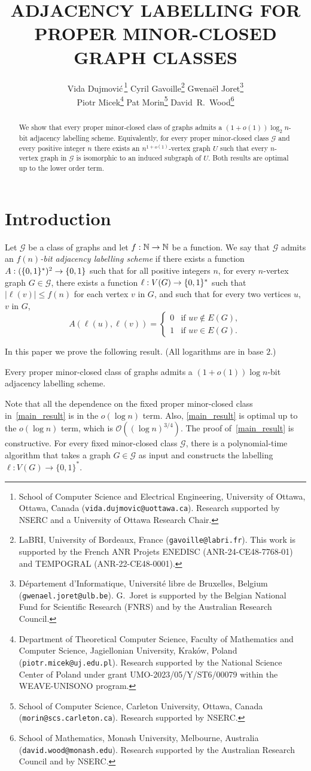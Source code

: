 \documentclass{patmorin}
\title{\MakeUppercase{\boldmath  Adjacency labelling for proper minor-closed graph classes}}
\author{
 Vida Dujmovi{\'c}\,\footnote{School of Computer Science and Electrical Engineering, University of Ottawa, Ottawa, Canada (\texttt{vida.dujmovic@uottawa.ca}). Research supported by NSERC and a University of Ottawa Research Chair.}
 \qquad
 Cyril Gavoille\footnote{LaBRI, University of Bordeaux, France (\texttt{gavoille@labri.fr}). This work is supported by the French ANR Projets ENEDISC (ANR-24-CE48-7768-01) and TEMPOGRAL (ANR-22-CE48-0001).}
 \qquad
  Gwena\"el Joret\footnote{D\'epartement d'Informatique, Universit\'e libre de Bruxelles, Belgium ({\tt gwenael.joret@ulb.be}). G.\ Joret is supported by the Belgian National Fund for Scientific Research (FNRS) and by the Australian Research Council.} \\[1ex]
 Piotr Micek\footnote{Department of Theoretical Computer Science, Faculty of Mathematics and Computer Science, Jagiellonian University, Kraków, Poland (\texttt{piotr.micek@uj.edu.pl}). Research supported by the National Science Center of Poland under grant UMO-2023/05/Y/ST6/00079 within the WEAVE-UNISONO program.}
 \qquad
 Pat Morin\footnote{School of Computer Science, Carleton University, Ottawa, Canada (\texttt{morin@scs.carleton.ca}). Research supported by NSERC.}
 \qquad
 David~R.~Wood\footnote{School of Mathematics, Monash University, Melbourne, Australia (\texttt{david.wood@monash.edu}). Research supported by the Australian Research Council and by NSERC.}
 }
\date{}
\renewcommand{\leq}{\leqslant}
\newcommand{\defin}[1]{\emph{\textcolor{brightmaroon}{#1}}}
\newcommand{\Oh}{\calO}
\DeclarePairedDelimiter{\set}{\{}{\}}
\newcommand{\calG}{\mathcal{G}}
\newcommand{\calO}{\mathcal{O}}
\begin{document}
\maketitle


\begin{abstract}
  We show that every proper minor-closed class of graphs admits a $(1+o(1))\log_2 n$-bit adjacency labelling scheme. Equivalently, for every proper minor-closed class $\calG$ and every positive integer $n$ there exists an $n^{1+o(1)}$-vertex graph $U$ such that every $n$-vertex graph in $\calG$ is isomorphic to an induced subgraph of $U$.  Both results are optimal up to the lower order term.
\end{abstract}


  \section{Introduction}
Let $\calG$ be a class of graphs and let $f:\mathbb{N}\to\mathbb{N}$ be a function.
We say that $\calG$ admits an \defin{$f(n)$-bit adjacency labelling scheme} if there exists a function $A:(\set{0,1}^*)^2\to\set{0,1}$ such that for all positive integers $n$, for every $n$-vertex graph $G\in\calG$, there exists a function $\ell: V(G)\to\set{0,1}^*$ such that
$|\ell(v)|\leq f(n)$ for each vertex $v$ in $G$, and such that
for every two vertices $u$, $v$ in $G$,
\[
A(\ell(u),\ell(v))=\begin{cases}
0&\textrm{if $uv\notin E(G)$},\\
1&\textrm{if $uv\in E(G)$}.
\end{cases}
\]

In this paper we prove the following result. (All logarithms are in base $2$.)

\begin{thm}
\label{main_result}
Every proper minor-closed class of graphs admits
a $(1+o(1))\log n$-bit adjacency labelling scheme.
\end{thm}


Note that all the dependence on the fixed proper minor-closed class in~\cref{main_result} is in the $o(\log n)$ term. Also, \cref{main_result} is optimal up to the $o(\log n)$ term,
which is $\Oh\left((\log n)^{3/4}\right)$.
The proof of~\cref{main_result} is constructive. For every fixed minor-closed class $\calG$, there is a polynomial-time algorithm that takes a graph $G\in\calG$ as input and constructs the labelling $\ell:V(G)\to\{0,1\}^*$.
\end{document}
